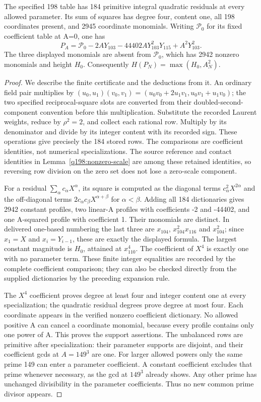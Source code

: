 \begin{proposition}\label{q198:finite-algebra}
The specified 198 table has 184 primitive integral quadratic
residuals at every allowed parameter. Its sum of squares has degree
four, content one, all 198 coordinates present, and 2945 coordinate
monomials. Writing $\mathcal P_0$ for its fixed coefficient table
at A=0, one has
\[
 P_A=\mathcal P_0-2AY_{103}-44402AY_{103}^2Y_{115}
                                      +A^2Y_{103}^2.
\]
The three displayed monomials are absent from $\mathcal P_0$,
which has 2942 nonzero monomials and height $H_0$.
Consequently $H(P_N)=\max(H_0,A_N^2)$.
\end{proposition}
\begin{proof}
We describe the finite certificate and the deductions from it.
An ordinary field pair multiplies by
$(u_0,u_1)(v_0,v_1)=(u_0v_0+2u_1v_1,u_0v_1+u_1v_0)$;
the two specified reciprocal-square slots are converted from their
doubled-second-component convention before this multiplication.
Substitute the recorded Laurent weights, reduce by $\rho^2=2$,
and collect each rational row. Multiply by its denominator and
divide by its integer content with its recorded sign. These
operations give precisely the 184 stored rows. The comparisons
are coefficient identities, not numerical specializations.
The source reference and contact identities in
Lemma~\ref{q198:nonzero-scale} are among these retained identities,
so reversing row division on the zero set does not lose a
zero-scale component.

For a residual $\sum_\alpha c_\alpha X^\alpha$, its square is
computed as the diagonal terms $c_\alpha^2X^{2\alpha}$ and the
off-diagonal terms $2c_\alpha c_\beta X^{\alpha+\beta}$ for
$\alpha<\beta$. Adding all 184 dictionaries gives 2942 constant
profiles, two linear-A profiles with coefficients -2 and -44402,
and one A-squared profile with coefficient 1. Their monomials are
distinct. In delivered one-based numbering the last three are
$x_{104}$, $x_{104}^2x_{116}$ and $x_{104}^2$; since $x_1=X$
and $x_i=Y_{i-1}$, these are exactly the displayed formula.
The largest constant magnitude is $H_0$, attained at $x_{110}^4$.
The coefficient of $X^4$ is exactly one with no parameter term.
These finite integer equalities are recorded by the complete
coefficient comparison; they can also be checked directly from
the supplied dictionaries by the preceding expansion rule.

The $X^4$ coefficient proves degree at least four and integer
content one at every specialization; the quadratic residual degrees
prove degree at most four. Each coordinate appears in the verified
nonzero coefficient dictionary. No allowed positive A can cancel
a coordinate monomial, because every profile contains only one
power of A. This proves the support assertions. The unbalanced
rows are primitive after specialization: their parameter supports
are disjoint, and their coefficient gcds at $A=149^3$ are one.
For larger allowed powers only the same prime 149 can enter a
parameter coefficient. A constant coefficient excludes that prime
whenever necessary, as the gcd at $149^3$ already shows. Any
other prime has unchanged divisibility in the parameter coefficients.
Thus no new common prime divisor appears.


\end{proof}

